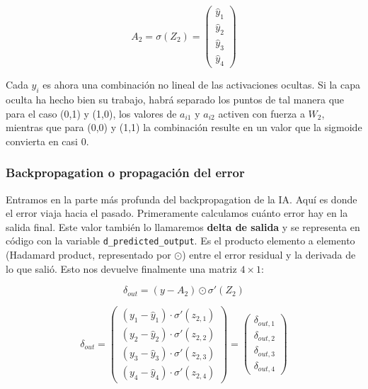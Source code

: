 \documentclass[a4paper,11pt]{article}
\renewenvironment{equation}{\begin{equation*}}{\end{equation*}}
\let\oldequation\equation
\let\endoldequation\endequation
\renewenvironment{equation}
  {\vspace{0.5em}\oldequation}
  {\endoldequation\vspace{0.5em}}
\begin{document}
\begin{equation}
A_2 = \sigma(Z_2) = \begin{pmatrix} \hat{y}_1 \\ \hat{y}_2 \\ \hat{y}_3 \\ \hat{y}_4 \end{pmatrix}
\end{equation}

Cada \(\hat{y}_i\) es ahora una combinación no lineal de las
activaciones ocultas. Si la capa oculta ha hecho bien su trabajo, habrá
separado los puntos de tal manera que para el caso (0,1) y (1,0), los
valores de \(a_{i1}\) y \(a_{i2}\) activen con fuerza a \(W_2\),
mientras que para (0,0) y (1,1) la combinación resulte en un valor que
la sigmoide convierta en casi 0.


\subsubsection{Backpropagation o propagación del error}

Entramos en la parte más profunda del backpropagation de la IA. Aquí es
donde el error viaja hacia el pasado. Primeramente calculamos cuánto
error hay en la salida final. Este valor también lo llamaremos
\textbf{delta de salida} y se representa en código con la variable
\texttt{d\_predicted\_output}. Es el producto elemento a elemento
(Hadamard product, representado por \(\odot\)) entre el error residual y
la derivada de lo que salió. Esto nos devuelve finalmente una matriz
\(4 \times 1\):

\begin{equation}\delta_{out} = (y - A_2) \odot \sigma'(Z_2)\end{equation}

\begin{equation}\delta_{out} = \begin{pmatrix} (y_1 - \hat{y}_1) \cdot \sigma'(z_{2,1}) \\ (y_2 - \hat{y}_2) \cdot \sigma'(z_{2,2}) \\ (y_3 - \hat{y}_3) \cdot \sigma'(z_{2,3}) \\ (y_4 - \hat{y}_4) \cdot \sigma'(z_{2,4}) \end{pmatrix} = \begin{pmatrix} \delta_{out,1} \\ \delta_{out,2} \\ \delta_{out,3} \\ \delta_{out,4} \end{pmatrix}\end{equation}
\end{document}
